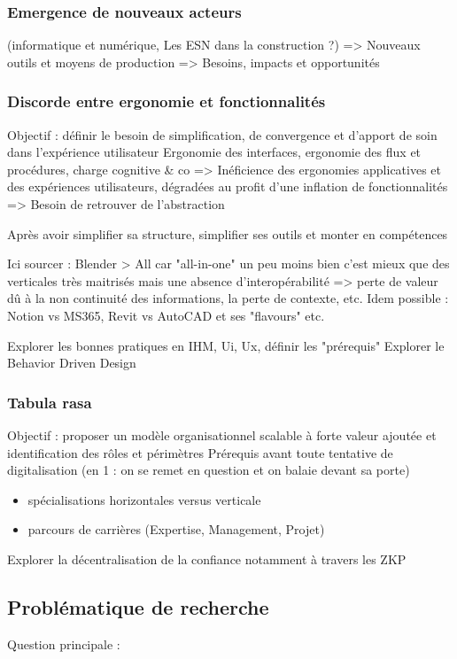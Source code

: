 \documentclass[a4paper,12pt]{article}
\begin{document}
\subsubsection{Emergence de nouveaux acteurs}
\label{sec:org5af09ba}
(informatique et numérique, Les ESN dans la construction ?)
=> Nouveaux outils et moyens de production
=> Besoins, impacts et opportunités
\subsubsection{Discorde entre ergonomie et fonctionnalités}
\label{sec:org5820898}
Objectif : définir le besoin de simplification, de convergence et d'apport de soin dans l'expérience utilisateur
Ergonomie des interfaces, ergonomie des flux et procédures, charge cognitive \& co
=> Inéficience des ergonomies applicatives et des expériences utilisateurs, dégradées au profit d'une inflation de fonctionnalités
=> Besoin de retrouver de l'abstraction

Après avoir simplifier sa structure, simplifier ses outils et monter en compétences

Ici sourcer : Blender > All car "all-in-one" un peu moins bien c'est mieux que des verticales très maitrisés mais une absence d'interopérabilité => perte de valeur dû à la non continuité des informations, la perte de contexte, etc.
Idem possible : Notion vs MS365, Revit vs AutoCAD et ses "flavours"
etc.

Explorer les bonnes pratiques en IHM, Ui, Ux, définir les "prérequis" 
Explorer le Behavior Driven Design 
\subsubsection{Tabula rasa}
\label{sec:orga7cf5d0}
Objectif : proposer un modèle organisationnel scalable à forte valeur ajoutée et identification des rôles et périmètres 
Prérequis avant toute tentative de digitalisation (en 1 : on se remet en question et on balaie devant sa porte)
\begin{itemize}
\item spécialisations horizontales versus verticale
\item parcours de carrières (Expertise, Management, Projet)
\end{itemize}

Explorer la décentralisation de la confiance notamment à travers les ZKP
\subsection{Problématique de recherche}
\label{sec:org8479631}
Question principale :
\end{document}
